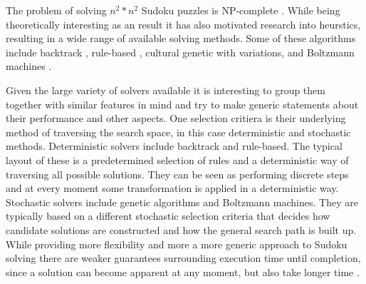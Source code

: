 \documentclass[a4paper,11pt]{kth-mag}
\begin{document}
The problem of solving $n^2 * n^2$ Sudoku puzzles is NP-complete \cite{complexity}.
While being theoretically interesting as an result it has also motivated research into heurstics, resulting in a wide range of available solving methods.
Some of these algorithms include backtrack \cite{searchBased}, rule-based \cite{techniques}, cultural genetic with variations\cite{stochastic}, and Boltzmann machines \cite{boltzmann}.

Given the large variety of solvers available it is interesting to group them together with similar features in mind and try to make generic statements about their performance and other aspects.
One selection critiera is their underlying method of traversing the search space, in this case deterministic and stochastic methods.
Deterministic solvers include backtrack and rule-based.
The typical layout of these is a predetermined selection of rules and a deterministic way of traversing all possible solutions.
They can be seen as performing discrete steps and at every moment some transformation is applied in a deterministic way.
Stochastic solvers include genetic algorithms and Boltzmann machines.
They are typically based on a different stochastic selection criteria that decides how candidate solutions are constructed and how the general search path is built up.
While providing more flexibility and more a more generic approach to Sudoku solving there are weaker guarantees surrounding execution time until completion, since a solution can become apparent at any moment, but also take longer time \cite{stochastic}.
\end{document}
